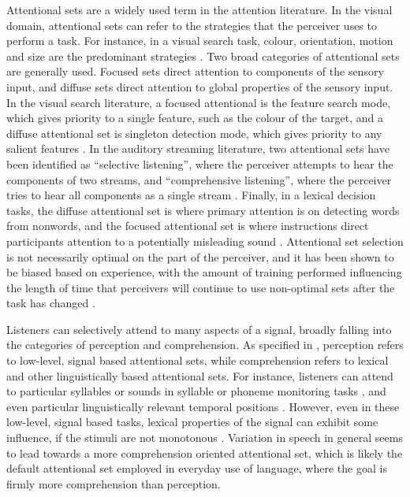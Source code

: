 Attentional sets are a widely used term in the attention literature.  
In the visual domain, attentional sets can refer to the strategies that the perceiver uses to perform a task.  
For instance, in a visual search task, colour, orientation, motion and size are the predominant strategies \citep{Wolfe2004}.  
Two broad categories of attentional sets are generally used.  
Focused sets direct attention to components of the sensory input, and diffuse sets direct attention to global properties of the sensory input.  
In the visual search literature, a focused attentional is the feature search mode, which gives priority to a single feature, such as the colour of the target, and a diffuse attentional set is singleton detection mode, which gives priority to any salient features \citep{Bacon1994}. 
In the auditory streaming literature, two attentional sets have been identified as ``selective listening'', where the perceiver attempts to hear the components of two streams, and ``comprehensive listening'', where the perceiver tries to hear all components as a single stream  \citep{vanNoorden1975}.
Finally, in a lexical decision tasks, the diffuse attentional set is where primary attention is on detecting words from nonwords, and the focused attentional set is where instructions direct participants attention to a potentially misleading sound \citep{Pitt2012}.
Attentional set selection is not necessarily optimal on the part of the perceiver, and it has been shown to be biased based on experience, with the amount of training performed influencing the length of time that perceivers will continue to use non-optimal sets after the task has changed \citep{Leber2006}.  

Listeners can selectively attend to many aspects of a signal, broadly falling into the categories of perception and comprehension.
As specified in \citet{Cutler}, perception refers to low-level, signal based attentional sets, while comprehension refers to lexical and other linguistically based attentional sets.
For instance, listeners can attend to particular syllables or sounds in syllable or phoneme monitoring tasks \citep{somerefs}, and even particular linguistically relevant temporal positions \citep{Pitt1990}.
However, even in these low-level, signal based tasks, lexical properties of the signal can exhibit some influence, if the stimuli are not monotonous \citep{Cutler}.  
Variation in speech in general seems to lead towards a more comprehension oriented attentional set, which is likely the default attentional set employed in everyday use of language, where the goal is firmly more comprehension than perception.

